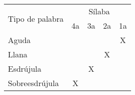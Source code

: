 \documentclass[12pt]{article}
\begin{document}
\begin{tabular}{@{}|p{2in}|c|c|c|c|@{}}

\hline 
\multirow{2}{*}{Tipo de palabra} & \multicolumn{4}{c|}{S\'ilaba}  \\ 
\cline{2-5}
                 & 4a & 3a & 2a & 1a \\
\hline 
Aguda            &    &    &    & X  \\
\hline 
Llana            &    &    & X  & \\
\hline 
Esdr\'ujula      &    & X  &    & \\
\hline 
Sobreesdr\'ujula & X  &    &    & \\
\hline
\end{tabular}
\end{document}
